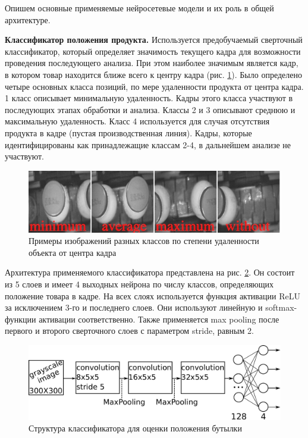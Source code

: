 Опишем основные применяемые нейросетевые модели и их роль в общей архитектуре.

\textbf{Классификатор положения продукта.} Используется предобучаемый сверточный классификатор, который определяет значимость текущего кадра для возможности проведения последующего анализа. При этом наиболее значимым является кадр, в котором товар находится ближе всего к центру кадра (рис. \ref{fig:distance_classes}). Было определено четыре основных класса позиций, по мере удаленности продукта от центра кадра. 1 класс описывает минимальную удаленность. Кадры этого класса участвуют в последующих этапах обработки и анализа. Классы 2 и 3 описывают среднюю и максимальную удаленность. Класс 4 используется для случая отсутствия продукта в кадре (пустая производственная линия).
Кадры, которые идентифицированы как принадлежащие классам 2-4, в дальнейшем анализе не участвуют. 

\begin{figure}[ht]
	\centering
	\includegraphics[width=16cm]{man-source/images/ch4/pic4-24.jpg}
	\caption{Примеры изображений разных классов по степени удаленности объекта от центра кадра}
	\label{fig:distance_classes}
\end{figure}

Архитектура применяемого классификатора представлена на рис. \ref{fig:nn_class1}. Он состоит из 5 слоев и имеет 4 выходных нейрона по числу классов, определяющих положение товара в кадре. На всех слоях используется функция активации ReLU за исключением 3-го и последнего слоев. Они используют линейную и softmax-функции активации соответственно. Также применяется max pooling после первого и второго сверточного слоев с параметром stride, равным 2.

\begin{figure}[ht]
	\centering
	\includegraphics[width=16cm]{man-source/images/ch4/pic4-4.pdf}
	\caption{Структура классификатора для оценки положения бутылки \cite{26-A}}
	\label{fig:nn_class1}
\end{figure}

